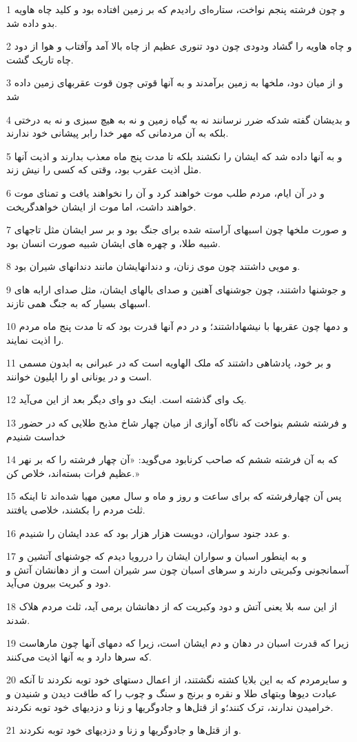 \par 1 و چون فرشته پنجم نواخت، ستاره‌ای رادیدم که بر زمین افتاده بود و کلید چاه هاویه بدو داده شد.
\par 2 و چاه هاویه را گشاد ودودی چون دود تنوری عظیم از چاه بالا آمد وآفتاب و هوا از دود چاه تاریک گشت.
\par 3 و از میان دود، ملخها به زمین برآمدند و به آنها قوتی چون قوت عقربهای زمین داده شد
\par 4 و بدیشان گفته شدکه ضرر نرسانند نه به گیاه زمین و نه به هیچ سبزی و نه به درختی بلکه به آن مردمانی که مهر خدا رابر پیشانی خود ندارند.
\par 5 و به آنها داده شد که ایشان را نکشند بلکه تا مدت پنج ماه معذب بدارند و اذیت آنها مثل اذیت عقرب بود، وقتی که کسی را نیش زند.
\par 6 و در آن ایام، مردم طلب موت خواهند کرد و آن را نخواهند یافت و تمنای موت خواهند داشت، اما موت از ایشان خواهدگریخت.
\par 7 و صورت ملخها چون اسبهای آراسته شده برای جنگ بود و بر سر ایشان مثل تاجهای شبیه طلا، و چهره های ایشان شبیه صورت انسان بود.
\par 8 و مویی داشتند چون موی زنان، و دندانهایشان مانند دندانهای شیران بود.
\par 9 و جوشنها داشتند، چون جوشنهای آهنین و صدای بالهای ایشان، مثل صدای ارابه های اسبهای بسیار که به جنگ همی تازند.
\par 10 و دمها چون عقربها با نیشهاداشتند؛ و در دم آنها قدرت بود که تا مدت پنج ماه مردم را اذیت نمایند.
\par 11 و بر خود، پادشاهی داشتند که ملک الهاویه است که در عبرانی به ابدون مسمی است و در یونانی او را اپلیون خوانند.
\par 12 یک وای گذشته است. اینک دو وای دیگر بعد از این می‌آید.
\par 13 و فرشته ششم بنواخت که ناگاه آوازی از میان چهار شاخ مذبح طلایی که در حضور خداست شنیدم
\par 14 که به آن فرشته ششم که صاحب کرنابود می‌گوید: «آن چهار فرشته را که بر نهر عظیم فرات بسته‌اند، خلاص کن.»
\par 15 پس آن چهارفرشته که برای ساعت و روز و ماه و سال معین مهیا شده‌اند تا اینکه ثلث مردم را بکشند، خلاصی یافتند.
\par 16 و عدد جنود سواران، دویست هزار هزار بود که عدد ایشان را شنیدم.
\par 17 و به اینطور اسبان و سواران ایشان را دررویا دیدم که جوشنهای آتشین و آسمانجونی وکبریتی دارند و سرهای اسبان چون سر شیران است و از دهانشان آتش و دود و کبریت بیرون می‌آید.
\par 18 از این سه بلا یعنی آتش و دود وکبریت که از دهانشان برمی آید، ثلث مردم هلاک شدند.
\par 19 زیرا که قدرت اسبان در دهان و دم ایشان است، زیرا که دمهای آنها چون مارهاست که سرها دارد و به آنها اذیت می‌کنند.
\par 20 و سایرمردم که به این بلایا کشته نگشتند، از اعمال دستهای خود توبه نکردند تا آنکه عبادت دیوها وبتهای طلا و نقره و برنج و سنگ و چوب را که طاقت دیدن و شنیدن و خرامیدن ندارند، ترک کنند؛و از قتل‌ها و جادوگریها و زنا و دزدیهای خود توبه نکردند.
\par 21 و از قتل‌ها و جادوگریها و زنا و دزدیهای خود توبه نکردند.

